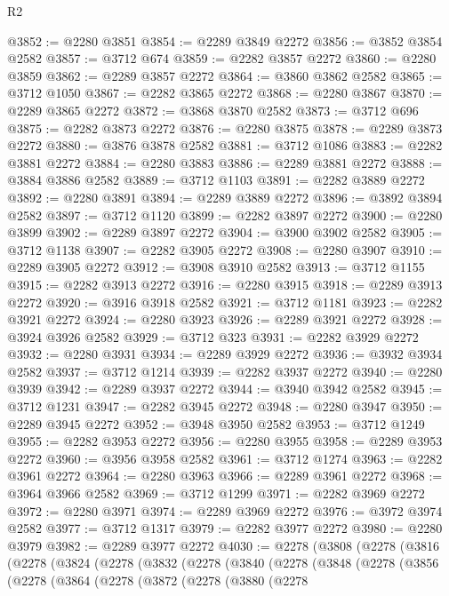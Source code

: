 \begin{lexlean}{R2}
\begin{coremodule}
@3852 := @2280 @3851
@3854 := @2289 @3849 @2272
@3856 := @3852 @3854 @2582
@3857 := @3712 @674
@3859 := @2282 @3857 @2272
@3860 := @2280 @3859
@3862 := @2289 @3857 @2272
@3864 := @3860 @3862 @2582
@3865 := @3712 @1050
@3867 := @2282 @3865 @2272
@3868 := @2280 @3867
@3870 := @2289 @3865 @2272
@3872 := @3868 @3870 @2582
@3873 := @3712 @696
@3875 := @2282 @3873 @2272
@3876 := @2280 @3875
@3878 := @2289 @3873 @2272
@3880 := @3876 @3878 @2582
@3881 := @3712 @1086
@3883 := @2282 @3881 @2272
@3884 := @2280 @3883
@3886 := @2289 @3881 @2272
@3888 := @3884 @3886 @2582
@3889 := @3712 @1103
@3891 := @2282 @3889 @2272
@3892 := @2280 @3891
@3894 := @2289 @3889 @2272
@3896 := @3892 @3894 @2582
@3897 := @3712 @1120
@3899 := @2282 @3897 @2272
@3900 := @2280 @3899
@3902 := @2289 @3897 @2272
@3904 := @3900 @3902 @2582
@3905 := @3712 @1138
@3907 := @2282 @3905 @2272
@3908 := @2280 @3907
@3910 := @2289 @3905 @2272
@3912 := @3908 @3910 @2582
@3913 := @3712 @1155
@3915 := @2282 @3913 @2272
@3916 := @2280 @3915
@3918 := @2289 @3913 @2272
@3920 := @3916 @3918 @2582
@3921 := @3712 @1181
@3923 := @2282 @3921 @2272
@3924 := @2280 @3923
@3926 := @2289 @3921 @2272
@3928 := @3924 @3926 @2582
@3929 := @3712 @323
@3931 := @2282 @3929 @2272
@3932 := @2280 @3931
@3934 := @2289 @3929 @2272
@3936 := @3932 @3934 @2582
@3937 := @3712 @1214
@3939 := @2282 @3937 @2272
@3940 := @2280 @3939
@3942 := @2289 @3937 @2272
@3944 := @3940 @3942 @2582
@3945 := @3712 @1231
@3947 := @2282 @3945 @2272
@3948 := @2280 @3947
@3950 := @2289 @3945 @2272
@3952 := @3948 @3950 @2582
@3953 := @3712 @1249
@3955 := @2282 @3953 @2272
@3956 := @2280 @3955
@3958 := @2289 @3953 @2272
@3960 := @3956 @3958 @2582
@3961 := @3712 @1274
@3963 := @2282 @3961 @2272
@3964 := @2280 @3963
@3966 := @2289 @3961 @2272
@3968 := @3964 @3966 @2582
@3969 := @3712 @1299
@3971 := @2282 @3969 @2272
@3972 := @2280 @3971
@3974 := @2289 @3969 @2272
@3976 := @3972 @3974 @2582
@3977 := @3712 @1317
@3979 := @2282 @3977 @2272
@3980 := @2280 @3979
@3982 := @2289 @3977 @2272
@4030 := @2278
    (@3808
      (@2278
        (@3816
          (@2278
            (@3824
              (@2278
                (@3832
                  (@2278
                    (@3840
                      (@2278
                        (@3848
                          (@2278
                            (@3856
                              (@2278
                                (@3864
                                  (@2278
                                    (@3872
                                      (@2278
                                        (@3880
                                          (@2278

\end{coremodule}
\end{lexlean}
